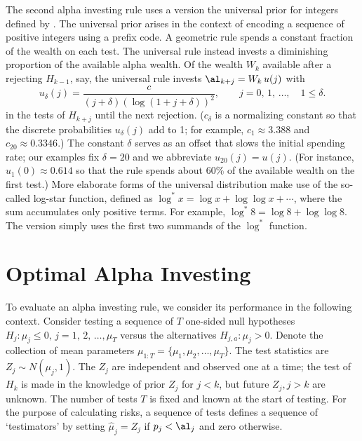 \documentclass[12pt]{article}
\begin{document}
 The second alpha investing rule uses a version the universal prior for integers
 defined by \citet{rissanen83}.  The universal prior arises in the context of
 encoding a sequence of positive integers using a prefix code.  A geometric rule
 spends a constant fraction of the wealth on each test.  The universal rule
 instead invests a diminishing proportion of the available alpha wealth.  Of the
 wealth $W_k$ available after a rejecting $H_{k-1}$, say, the universal rule
 invests $\al_{k+j} = W_k\,u(j)$ with
 \begin{equation}
   u_\delta(j) = \frac{c}{ (j+\delta) (\log (1+j+\delta))^2}, \qquad 
                 j =  0,\,1,\,\ldots, \quad 1 \le \delta.
 \label{eq:univ}
 \end{equation}
 in the tests of $H_{k+j}$ until the next rejection. ($c_\delta$ is a
 normalizing constant so that the discrete probabilities $u_\delta(j)$ add to 1;
 for example, $c_{1} \approx 3.388$ and $c_{20} \approx 0.3346$.)  The constant
 $\delta$ \marginpar{$\delta$} serves as an offset that slows the initial
 spending rate; our examples fix $\delta=20$ and we abbreviate $u_{20}(j) =
 u(j)$. (For instance, $u_1(0) \approx 0.614$ so that the rule spends about 60\%
 of the available wealth on the first test.)  More elaborate forms of the
 universal distribution make use of the so-called log-star function, defined as
 $\log^* x = \log x + \log \log x + \cdots$, where the sum accumulates only
 positive terms.  For example, $\log^{*} 8 = \log 8 + \log \log 8$.  The version
  simply uses the first two summands of the $\log^{*}$ function.
 


\section{Optimal Alpha Investing}
 
 To evaluate an alpha investing rule, we consider its performance in the
 following context.  Consider testing a sequence of $T$ one-sided null
 hypotheses $H_j: \mu_j \le 0, \, j=1,\,2,\, \ldots, \mu_T$ versus the alternatives
 $H_{j,a}: \mu_j > 0$.   Denote the collection of mean
 parameters $\mu_{1:T} = \{\mu_1, \mu_2, \ldots, \mu_T\}$.  The test statistics
 are $Z_j \sim N(\mu_j,1)$.  The $Z_j$ are independent and observed one at a
 time; the test of $H_k$ is made in the knowledge of prior $Z_j$ for $j<k$, but
 future $Z_j, j > k$ are unknown.  The number of tests $T$ is fixed and known at
 the start of testing.  For the purpose of calculating risks, a sequence of
 tests defines a sequence of `testimators' by setting $\hat\mu_j = Z_j$ if
 $p_j<\al_j$ and zero otherwise.
 
\end{document}
